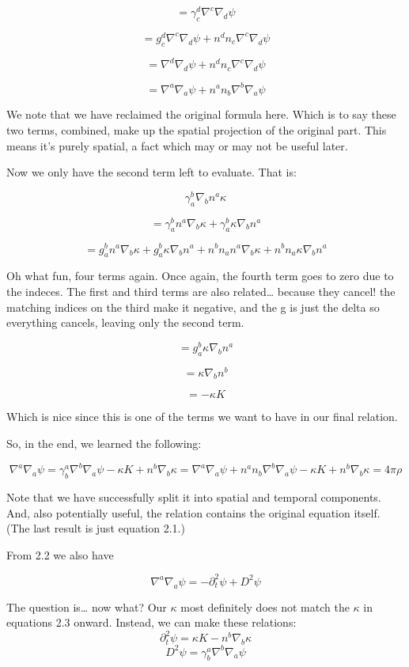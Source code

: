 \documentclass[landscape,letterpaper,10pt,english]{article}
\begin{document}
\[ = \gamma^d_c \nabla^c \nabla_d \psi \]

\[ = g^d_c \nabla^c \nabla_d \psi + n^dn_c \nabla^c \nabla_d \psi \]

\[ = \nabla^d \nabla_d \psi + n^dn_c \nabla^c \nabla_d \psi \]

\[ = \nabla^a \nabla_a \psi + n^an_b \nabla^b \nabla_a \psi \]

We note that we have reclaimed the original formula here. Which is to
say these two terms, combined, make up the spatial projection of the
original part. This means it's purely spatial, a fact which may or may
not be useful later.

    Now we only have the second term left to evaluate. That is:

\[ \gamma^b_a \nabla_b n^a \kappa \]

\[ = \gamma^b_a n^a \nabla_b \kappa + \gamma^b_a \kappa \nabla_b n^a\]

\[ = g^b_a n^a \nabla_b \kappa + g^b_a \kappa \nabla_b n^a + n^bn_a n^a \nabla_b \kappa + n^bn_a \kappa \nabla_b n^a\]

    Oh what fun, four terms again. Once again, the fourth term goes to zero
due to the indeces. The first and third terms are also related\ldots{}
because they cancel! the matching indices on the third make it negative,
and the g is just the delta so everything cancels, leaving only the
second term.

\[ = g^b_a \kappa \nabla_b n^a \]

\[ = \kappa \nabla_b n^b \]

\[ = - \kappa K \]

Which is nice since this is one of the terms we want to have in our
final relation.

So, in the end, we learned the following:

\[ \nabla^a \nabla_a \psi = \gamma^a_b \nabla^b \nabla_a \psi - \kappa K + n^b \nabla_b \kappa = \nabla^a \nabla_a \psi + n^an_b \nabla^b \nabla_a \psi -\kappa K + n^b \nabla_b \kappa = 4\pi \rho\]

Note that we have successfully split it into spatial and temporal
components. And, also potentially useful, the relation contains the
original equation itself. (The last result is just equation 2.1.)

From 2.2 we also have

\[ \nabla^a \nabla_a \psi = -\partial_t^2 \psi + D^2 \psi \]

    The question is\ldots{} now what? Our \(\kappa\) most definitely does
not match the \(\kappa\) in equations 2.3 onward. Instead, we can make
these relations:
\[ \partial_t^2 \psi = \kappa K - n^b \nabla_b \kappa \]
\[ D^2 \psi = \gamma^a_b \nabla^b \nabla_a \psi \]
\end{document}
